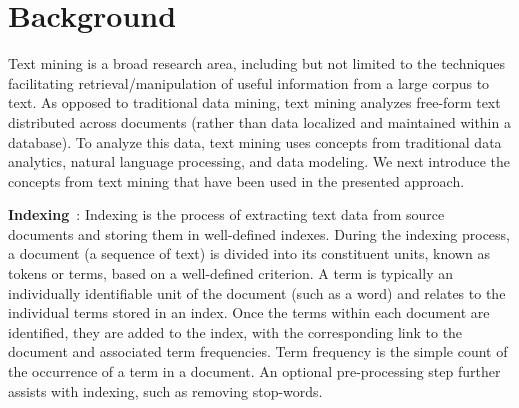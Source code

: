 \section{Background}
\label{sec:background}


Text mining is a broad research area, 
including but not limited to the techniques 
facilitating retrieval/manipulation of useful information from a large corpus to text. 
As opposed to traditional data mining, text mining analyzes
free-form text distributed across documents
(rather than data localized and maintained within a database).
To analyze this data, text mining uses concepts from traditional
data analytics, natural language processing, and data modeling.
We next introduce the concepts from text mining that have been used in the presented approach.


\textbf{Indexing}~\cite{frakes1992introduction,manning2008introduction}:
Indexing is the process of extracting text data from source documents
and storing them in well-defined indexes.
During the indexing process, a document (a sequence of text) is divided into its constituent units, known as tokens or terms, based on a well-defined criterion. 
A term is typically an individually identifiable unit of the document (such as a word) and relates to the individual terms stored in an index. Once the terms within each document are identified, they are added to the index, with the corresponding link to the document and associated term frequencies.
Term frequency is the simple count of the occurrence of a term in a document.
An optional pre-processing step further assists with indexing, such as removing stop-words. 


